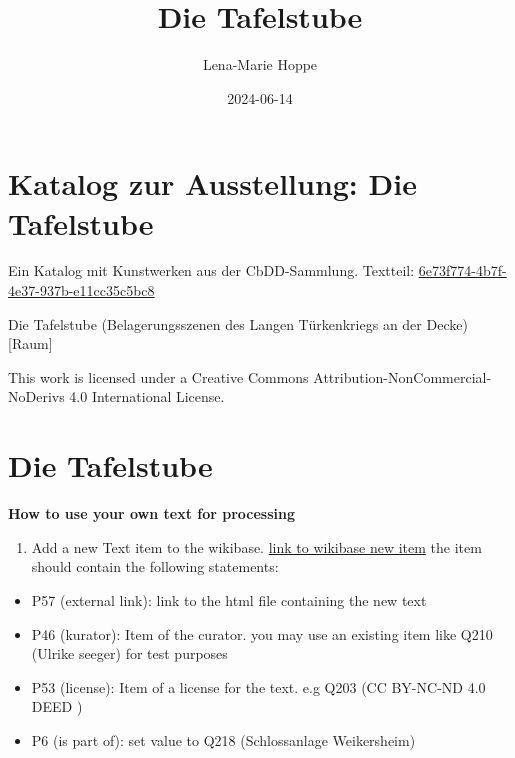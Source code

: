 \documentclass[
  a4paper,
  portrait]{book}
\title{Die Tafelstube}
\author{Lena-Marie Hoppe}
\date{2024-06-14}
\providecommand{\tightlist}{%
  \setlength{\itemsep}{0pt}\setlength{\parskip}{0pt}}\usepackage{longtable,booktabs,array}
\renewcommand*\contentsname{Table of contents}
\newcommand\contentsname{Table of contents}
\begin{document}
\frontmatter
\maketitle

\renewcommand*\contentsname{Table of contents}
{
\setcounter{tocdepth}{2}
\tableofcontents
}
\mainmatter
{}

\chapter{Katalog zur Ausstellung: Die
Tafelstube}\label{katalog-zur-ausstellung-die-tafelstube}

Ein Katalog mit Kunstwerken aus der CbDD-Sammlung. Textteil:
\href{https://www.deckenmalerei.eu/42d06165-58e7-4653-bfe4-3d5f7091fc33\#6e73f774-4b7f-4e37-937b-e11cc35c5bc8}{6e73f774-4b7f-4e37-937b-e11cc35c5bc8}

Die Tafelstube (Belagerungsszenen des Langen Türkenkriegs an der Decke)
{[}Raum{]}

This work is licensed under a Creative Commons
Attribution-NonCommercial-NoDerivs 4.0 International License.


\chapter{Die Tafelstube}\label{die-tafelstube}

\textbf{How to use your own text for processing}

\begin{enumerate}
\def\labelenumi{\arabic{enumi}.}
\tightlist
\item
  Add a new Text item to the wikibase.
  \href{https://computational-publishing-service.wikibase.cloud/wiki/Special:NewItem}{link
  to wikibase new item} the item should contain the following
  statements:
\end{enumerate}

\begin{itemize}
\tightlist
\item
  P57 (external link): link to the html file containing the new text
\item
  P46 (kurator): Item of the curator. you may use an existing item like
  Q210 (Ulrike seeger) for test purposes
\item
  P53 (license): Item of a license for the text. e.g Q203 (CC BY-NC-ND
  4.0 DEED )
\item
  P6 (is part of): set value to Q218 (Schlossanlage Weikersheim)
\end{itemize}
\end{document}
